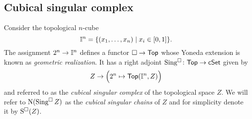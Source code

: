 \subsection{Cubical singular complex}

Consider the topological $n$-cube
\[
\mathbb{I}^{n} = \{(x_1, \dots, x_n) \mid x_i \in [0,1]\}.
\]
The assignment $2^n \to \mathbb{I}^n$ defines a functor $\square \to \mathsf{Top}$ whose Yoneda extension is known as \textit{geometric realization}.
It has a right adjoint $\operatorname{Sing^{\square}} \colon \mathsf{Top} \to \mathsf{cSet}$ given by
\[
Z \to \Big(2^n \mapsto \mathsf{Top}(\mathbb{I}^n, Z)\Big)
\]
and referred to as the \textit{cubical singular complex} of the topological space $Z$.
We will refer to $\operatorname{N}(\operatorname{Sing^{\square}} Z)$ as the \textit{cubical singular chains} of $Z$ and for simplicity denote it by $\operatorname{S^{\square}}(Z)$.